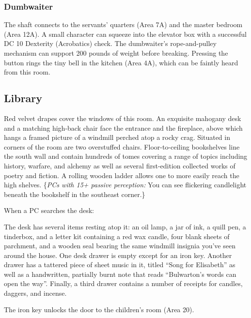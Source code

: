 \subsubsection*{Dumbwaiter}
The shaft connects to the servants' quarters (Area 7A) and the master bedroom (Area 12A). A small character can
squeeze into the elevator box with a successful DC 10 Dexterity (Acrobatics) check. The dumbwaiter's
rope-and-pulley mechanism can support 200 pounds of weight before breaking. Pressing the button rings the tiny
bell in the kitchen (Area 4A), which can be faintly heard from this room.

\begin{arealinks}
\end{arealinks}


\pagebreak
\subsection{Library}
\label{sec:Library}
\begin{readout}
  Red velvet drapes cover the windows of this room. An exquisite mahogany desk and a matching high-back chair
  face the entrance and the fireplace, above which hangs a framed picture of a windmill perched atop a rocky
  crag. Situated in corners of the room are two overstuffed chairs. Floor-to-ceiling bookshelves line the south
  wall and contain hundreds of tomes covering a range of topics including history, warfare, and alchemy as well
  as several first-edition collected works of poetry and fiction. A rolling wooden ladder allows one to more
  easily reach the high shelves. \{\textit{PCs with 15+ passive perception:} You can see flickering candlelight
  beneath the bookshelf in the southeast corner.\}
\end{readout}
When a PC searches the desk:
\begin{readout}
  The desk has several items resting atop it: an oil lamp, a jar of ink,
  a quill pen, a tinderbox, and a letter kit containing a red wax candle, four blank sheets of parchment, and
  a wooden seal bearing the same windmill insignia you've seen around the house. One desk drawer is empty except
  for an iron key. Another drawer has a tattered piece of sheet music in it, titled ``Song for Elisabeth'' as
  well as a handwritten, partially burnt note that reads ``Bulwarton's words can open the way''. Finally, a
  third drawer contains a number of receipts for candles, daggers, and incense.
\end{readout}
The iron key unlocks the door to the children's room (Area 20).

